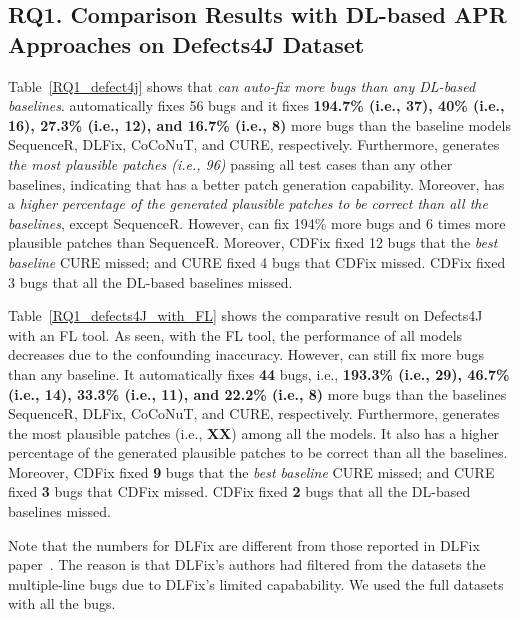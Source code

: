 \subsection{\bf RQ1. Comparison Results with DL-based APR Approaches on Defects4J Dataset}

Table~\ref{RQ1_defect4j} shows that {\em {\tool} can auto-fix more bugs
than any DL-based baselines}. {\tool}
automatically fixes 56 bugs and it fixes {\bf 194.7\% (i.e., 37), 40\%
(i.e., 16), 27.3\% (i.e., 12), and 16.7\% (i.e., 8)} more bugs than the
baseline models SequenceR, DLFix, CoCoNuT, and CURE,
respectively. {\color{red}{if add CURE*, this is not true}} Furthermore, {\tool} generates {\em the most plausible
patches (i.e., 96)} passing all test cases than any other baselines,
indicating that {\tool} has a better patch generation
capability. Moreover, {\tool} has a {\em higher percentage of the generated
plausible patches to be correct than all the baselines}, except
SequenceR. However, {\tool} can fix 194\% more bugs and 6 times more
plausible patches than SequenceR.
%
Moreover, CDFix fixed 12 bugs that the {\em best baseline} CURE
missed; and CURE fixed 4 bugs that CDFix missed. CDFix fixed 3 bugs
that all the DL-based baselines missed.

Table~\ref{RQ1_defects4J_with_FL} shows the comparative result on
Defects4J with an FL tool. As seen, with the FL tool, the performance
of all models decreases due to the confounding inaccuracy. However,
{\tool} can still fix more bugs than any baseline. It
automatically fixes {\bf 44} bugs, i.e., {\bf 193.3\% (i.e., 29), 46.7\%
  (i.e., 14), 33.3\% (i.e., 11), and 22.2\% (i.e., 8)} more bugs than
the baselines SequenceR, DLFix, CoCoNuT, and CURE,
respectively. {\color{red}{if add CURE*, this is not true}} Furthermore, {\tool} generates the most plausible
patches (i.e., {\bf XX}) among all the models.
It also has a higher percentage of the generated plausible patches to
be correct than all the baselines.
Moreover, CDFix fixed {\bf 9} bugs that the {\em best baseline} CURE
missed; and CURE fixed {\bf 3} bugs that CDFix missed. CDFix fixed
{\bf 2} bugs that all the DL-based baselines missed.

Note that the numbers for DLFix are different from those
reported in DLFix paper~\cite{icse20}. The reason is that DLFix's
authors had filtered from the datasets the multiple-line bugs due to
DLFix's limited capabability. We used the full datasets with all the
bugs.

